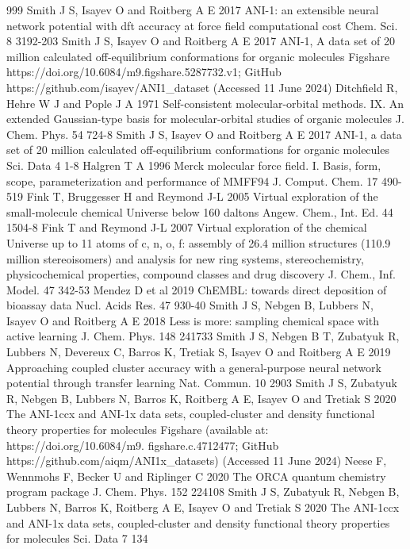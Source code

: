 \documentclass[12pt]{article}
\begin{document}
\begin{thebibliography}{999}
 Smith J S, Isayev O and Roitberg A E 2017 ANI-1: an extensible neural network potential with dft accuracy at force field computational cost Chem. Sci. 8 3192-203
 Smith J S, Isayev O and Roitberg A E 2017 ANI-1, A data set of 20 million calculated off-equilibrium conformations for organic molecules Figshare https://doi.org/10.6084/m9.figshare.5287732.v1; GitHub https://github.com/isayev/ANI1\_dataset (Accessed 11 June 2024)
 Ditchfield R, Hehre W J and Pople J A 1971 Self-consistent molecular-orbital methods. IX. An extended Gaussian-type basis for molecular-orbital studies of organic molecules J. Chem. Phys. 54 724-8
 Smith J S, Isayev O and Roitberg A E 2017 ANI-1, a data set of 20 million calculated off-equilibrium conformations for organic molecules Sci. Data 4 1-8
 Halgren T A 1996 Merck molecular force field. I. Basis, form, scope, parameterization and performance of MMFF94 J. Comput. Chem. 17 490-519
 Fink T, Bruggesser H and Reymond J-L 2005 Virtual exploration of the small-molecule chemical Universe below 160 daltons Angew. Chem., Int. Ed. 44 1504-8
 Fink T and Reymond J-L 2007 Virtual exploration of the chemical Universe up to 11 atoms of c, n, o, f: assembly of 26.4 million structures (110.9 million stereoisomers) and analysis for new ring systems, stereochemistry, physicochemical properties, compound classes and drug discovery J. Chem., Inf. Model. 47 342-53
 Mendez D et al 2019 ChEMBL: towards direct deposition of bioassay data Nucl. Acids Res. 47 930-40
 Smith J S, Nebgen B, Lubbers N, Isayev O and Roitberg A E 2018 Less is more: sampling chemical space with active learning J. Chem. Phys. 148 241733
 Smith J S, Nebgen B T, Zubatyuk R, Lubbers N, Devereux C, Barros K, Tretiak S, Isayev O and Roitberg A E 2019 Approaching coupled cluster accuracy with a general-purpose neural network potential through transfer learning Nat. Commun. 10 2903
 Smith J S, Zubatyuk R, Nebgen B, Lubbers N, Barros K, Roitberg A E, Isayev O and Tretiak S 2020 The ANI-1ccx and ANI-1x data sets, coupled-cluster and density functional theory properties for molecules Figshare (available at: https://doi.org/10.6084/m9. figshare.c.4712477; GitHub https://github.com/aiqm/ANI1x\_datasets) (Accessed 11 June 2024)
 Neese F, Wennmohs F, Becker U and Riplinger C 2020 The ORCA quantum chemistry program package J. Chem. Phys. 152 224108
 Smith J S, Zubatyuk R, Nebgen B, Lubbers N, Barros K, Roitberg A E, Isayev O and Tretiak S 2020 The ANI-1ccx and ANI-1x data sets, coupled-cluster and density functional theory properties for molecules Sci. Data 7 134

\end{thebibliography}
\end{document}

